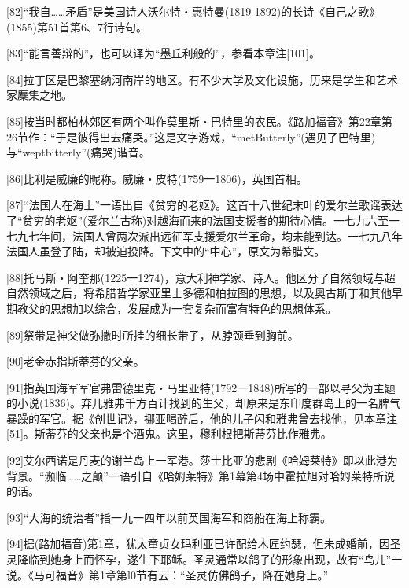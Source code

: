 \documentclass{article}
\begin{document}
[82]“我自……矛盾”是美国诗人沃尔特・惠特曼(1819-1892)的长诗《自己之歌》(1855)第51首第6、7行诗句。



[83]“能言善辩的”，也可以译为“墨丘利般的”，参看本章注[101]。



[84]拉丁区是巴黎塞纳河南岸的地区。有不少大学及文化设施，历来是学生和艺术家麇集之地。



[85]按当时都柏林郊区有两个叫作莫里斯・巴特里的农民。《路加福音》第22章第26节作：“于是彼得出去痛哭。”这是文字游戏，“metButterly”(遇见了巴特里)与“weptbitterly”(痛哭)谐音。



[86]比利是威廉的昵称。威廉・皮特(1759一1806)，英国首相。



[87]“法国人在海上”一语出自《贫穷的老妪》。这首十八世纪末叶的爱尔兰歌谣表达了“贫穷的老妪”(爱尔兰古称)对越海而来的法国支援者的期待心情。一七九六至一七九七年间，法国人曾两次派出远征军支援爱尔兰革命，均未能到达。一七九八年法国人虽登了陆，却被迫投降。下文中的“中心”，原文为希腊文。



[88]托马斯・阿奎那(1225一1274)，意大利神学家、诗人。他区分了自然领域与超自然领域之后，将希腊哲学家亚里士多德和柏拉图的思想，以及奥古斯丁和其他早期教父的思想加以综合，发展成为一套复杂而富有特色的思想体系。



[89]祭带是神父做弥撒时所挂的细长带子，从脖颈垂到胸前。



[90]老金赤指斯蒂芬的父亲。



[91]指英国海军军官弗雷德里克・马里亚特(1792一1848)所写的一部以寻父为主题的小说(1836)。弃儿雅弗千方百计找到的生父，却原来是东印度群岛上的一名脾气暴躁的军官。据《创世记》，挪亚喝醉后，他的儿子闪和雅弗曾去找他，见本章注[51]。斯蒂芬的父亲也是个酒鬼。这里，穆利根把斯蒂芬比作雅弗。



[92]艾尔西诺是丹麦的谢兰岛上一军港。莎士比亚的悲剧《哈姆莱特》即以此港为背景。“濒临……之颠”一语引自《哈姆莱特》第1幕第4场中霍拉旭对哈姆莱特所说的话。



[93]“大海的统治者”指一九一四年以前英国海军和商船在海上称霸。



[94]据(路加福音)第1章，犹太童贞女玛利亚已许配给木匠约瑟，但未成婚前，因圣灵降临到她身上而怀孕，遂生下耶稣。圣灵通常以鸽子的形象出现，故有“鸟儿”一说。《马可福音》第1章第l0节有云：“圣灵仿佛鸽子，降在她身上。”
\end{document}
